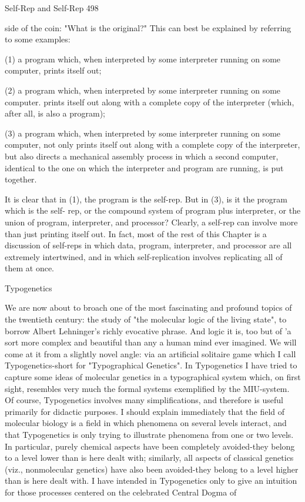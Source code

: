 {Self-Rep and Self-Rep                                                                        498

side of the coin: "What is the original?" This can best be explained by referring to some
examples:

      (1) a program which, when interpreted by some interpreter running on some
     computer, prints itself out;

     (2) a program which, when interpreted by some interpreter running on some
     computer. prints itself out along with a complete copy of the interpreter (which,
     after all, is also a program);

     (3) a program which, when interpreted by some interpreter running on some
     computer, not only prints itself out along with a complete copy of the interpreter,
     but also directs a mechanical assembly process in which a second computer,
     identical to the one on which the interpreter and program are running, is put
     together.

It is clear that in (1), the program is the self-rep. But in (3), is it the program which is the self-
rep, or the compound system of program plus interpreter, or the union of program,
interpreter, and processor?
         Clearly, a self-rep can involve more than just printing itself out. In fact, most of the
rest of this Chapter is a discussion of self-reps in which data, program, interpreter, and
processor are all extremely intertwined, and in which self-replication involves replicating all
of them at once.

                                           Typogenetics

We are now about to broach one of the most fascinating and profound topics of the twentieth
century: the study of "the molecular logic of the living state", to borrow Albert Lehninger's
richly evocative phrase. And logic it is, too but of 'a sort more complex and beautiful than
any a human mind ever imagined. We will come at it from a slightly novel angle: via an
artificial solitaire game which I call Typogenetics-short for "Typographical Genetics". In
Typogenetics I have tried to capture some ideas of molecular genetics in a typographical
system which, on first sight, resembles very much the formal systems exemplified by the
MIU-system. Of course, Typogenetics involves many simplifications, and therefore is useful
primarily for didactic purposes.
         I should explain immediately that the field of molecular biology is a field in which
phenomena on several levels interact, and that Typogenetics is only trying to illustrate
phenomena from one or two levels. In particular, purely chemical aspects have been
completely avoided-they belong to a level lower than is here dealt with; similarly, all aspects
of classical genetics (viz., nonmolecular genetics) have also been avoided-they belong to a
level higher than is here dealt with. I have intended in Typogenetics only to give an intuition
for those processes centered on the celebrated Central Dogma of




}
